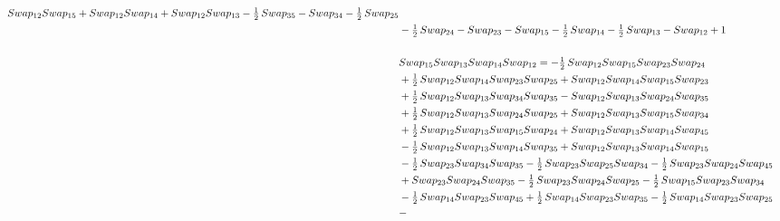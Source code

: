\documentclass[10pt,a4paper]{amsart}
\begin{document}
\begin{align*}
        \textnormal{Swap}_{12} \textnormal{Swap}_{15} + \textnormal{Swap}_{12} \textnormal{Swap}_{14} + \textnormal{Swap}_{12} \textnormal{Swap}_{13} - \tfrac12\,\textnormal{Swap}_{35}  - \textnormal{Swap}_{34}  - \tfrac12\,\textnormal{Swap}_{25}\\ & - \tfrac12\,\textnormal{Swap}_{24} - \textnormal{Swap}_{23} -
        \textnormal{Swap}_{15} - \tfrac12\,\textnormal{Swap}_{14} - \tfrac12\,\textnormal{Swap}_{13} - \textnormal{Swap}_{12} + 1\\
        \\
        &\textnormal{Swap}_{15}   \textnormal{Swap}_{13}   \textnormal{Swap}_{14}   \textnormal{Swap}_{12} = -\tfrac12\,\textnormal{Swap}_{12} \textnormal{Swap}_{15} \textnormal{Swap}_{23} \textnormal{Swap}_{24} \\ & 
         + \tfrac12\,\textnormal{Swap}_{12} \textnormal{Swap}_{14} \textnormal{Swap}_{23} \textnormal{Swap}_{25} + \textnormal{Swap}_{12} \textnormal{Swap}_{14} \textnormal{Swap}_{15} \textnormal{Swap}_{23} \\ & +
        \tfrac12\,\textnormal{Swap}_{12} \textnormal{Swap}_{13} \textnormal{Swap}_{34} \textnormal{Swap}_{35} - \textnormal{Swap}_{12} \textnormal{Swap}_{13} \textnormal{Swap}_{24} \textnormal{Swap}_{35} \\ & + \tfrac12\,\textnormal{Swap}_{12} \textnormal{Swap}_{13} \textnormal{Swap}_{24} \textnormal{Swap}_{25} +
        \textnormal{Swap}_{12} \textnormal{Swap}_{13} \textnormal{Swap}_{15} \textnormal{Swap}_{34}\\ & 
        + \tfrac12\,\textnormal{Swap}_{12} \textnormal{Swap}_{13} \textnormal{Swap}_{15} \textnormal{Swap}_{24} + \textnormal{Swap}_{12} \textnormal{Swap}_{13} \textnormal{Swap}_{14} \textnormal{Swap}_{45}\\ & -
        \tfrac12\,\textnormal{Swap}_{12} \textnormal{Swap}_{13} \textnormal{Swap}_{14} \textnormal{Swap}_{35} + \textnormal{Swap}_{12} \textnormal{Swap}_{13} \textnormal{Swap}_{14} \textnormal{Swap}_{15} \\ & 
        - \tfrac12\,\textnormal{Swap}_{23} \textnormal{Swap}_{34} \textnormal{Swap}_{35} -
        \tfrac12\,\textnormal{Swap}_{23} \textnormal{Swap}_{25} \textnormal{Swap}_{34} - \tfrac12\,\textnormal{Swap}_{23} \textnormal{Swap}_{24} \textnormal{Swap}_{45}\\ & + \textnormal{Swap}_{23} \textnormal{Swap}_{24} \textnormal{Swap}_{35} - \tfrac12\,\textnormal{Swap}_{23} \textnormal{Swap}_{24} \textnormal{Swap}_{25} -
        \tfrac12\,\textnormal{Swap}_{15} \textnormal{Swap}_{23} \textnormal{Swap}_{34}\\ & - \tfrac12\,\textnormal{Swap}_{14} \textnormal{Swap}_{23} \textnormal{Swap}_{45} + \tfrac12\,\textnormal{Swap}_{14} \textnormal{Swap}_{23} \textnormal{Swap}_{35} - \tfrac12\,\textnormal{Swap}_{14} \textnormal{Swap}_{23} \textnormal{Swap}_{25}\\ & -

\end{align*}
\end{document}
